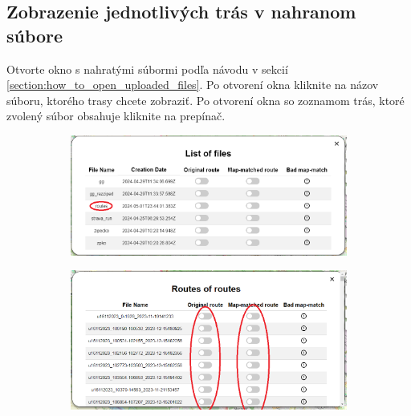\subsection{Zobrazenie jednotlivých trás v nahranom súbore}
Otvorte okno s nahratými súbormi podľa návodu v sekcií \ref{section:how_to_open_uploaded_files}. Po otvorení okna kliknite na názov súboru, ktorého trasy chcete zobraziť. Po otvorení okna so zoznamom trás, ktoré zvolený súbor obsahuje kliknite na prepínač. 
\begin{figure}[H]
    \centering
    \begin{subfigure}{1\textwidth}
        \centering
        \includegraphics[width=1\textwidth]{guide_includes/img/open_file.png}
    \end{subfigure}
    \begin{subfigure}{1\textwidth}
        \centering
        \includegraphics[width=1\textwidth]{guide_includes/img/toggle_route.png}
    \end{subfigure}
\end{figure}

